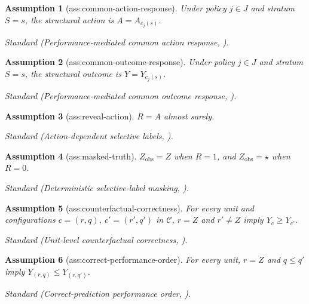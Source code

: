 \documentclass{article}
\newtheorem{assumption}{Assumption}
\begin{document}
\begin{assumption}[ass:common-action-response]\label{ass:common-action-response}
Under policy \(j\in J\) and stratum \(S=s\), the structural action is \(A=A_{c_j(s)}\).
\par\smallskip\noindent\emph{Standard} (Performance-mediated common action response, \cite{ChenOberst2025}).
\end{assumption}

\begin{assumption}[ass:common-outcome-response]\label{ass:common-outcome-response}
Under policy \(j\in J\) and stratum \(S=s\), the structural outcome is \(Y=Y_{c_j(s)}\).
\par\smallskip\noindent\emph{Standard} (Performance-mediated common outcome response, \cite{ChenOberst2025}).
\end{assumption}

\begin{assumption}[ass:reveal-action]\label{ass:reveal-action}
\(R=A\) almost surely.
\par\smallskip\noindent\emph{Standard} (Action-dependent selective labels, \cite{LakkarajuKleinbergLeskovecLudwigMullainathan2017}).
\end{assumption}

\begin{assumption}[ass:masked-truth]\label{ass:masked-truth}
\(Z_{\mathrm{obs}}=Z\) when \(R=1\), and \(Z_{\mathrm{obs}}=\star\) when \(R=0\).
\par\smallskip\noindent\emph{Standard} (Deterministic selective-label masking, \cite{LakkarajuKleinbergLeskovecLudwigMullainathan2017}).
\end{assumption}

\begin{assumption}[ass:counterfactual-correctness]\label{ass:counterfactual-correctness}
For every unit and configurations \(c=(r,q)\), \(c'=(r',q')\) in \(\mathcal C\), \(r=Z\) and \(r'\neq Z\) imply \(Y_c\ge Y_{c'}\).
\par\smallskip\noindent\emph{Standard} (Unit-level counterfactual correctness, \cite{ZhangSkalnesChenOberst2026}).
\end{assumption}

\begin{assumption}[ass:correct-performance-order]\label{ass:correct-performance-order}
For every unit, \(r=Z\) and \(q\le q'\) imply \(Y_{(r,q)}\le Y_{(r,q')}\).
\par\smallskip\noindent\emph{Standard} (Correct-prediction performance order, \cite{ZhangSkalnesChenOberst2026}).
\end{assumption}
\end{document}
